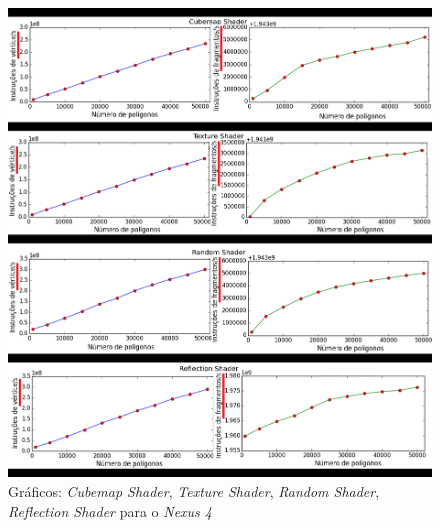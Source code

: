 	\begin{figure}[ht]
	\centering
		\includegraphics[keepaspectratio=true,scale=0.55]{figuras/cubeplot_pt.png}
	\caption{Gráficos: \textit{Cubemap Shader}, \textit{Texture Shader}, \textit{Random Shader}, \textit{Reflection Shader} para o \textit{Nexus 4}}
	\label{nexus2}
	\end{figure}


